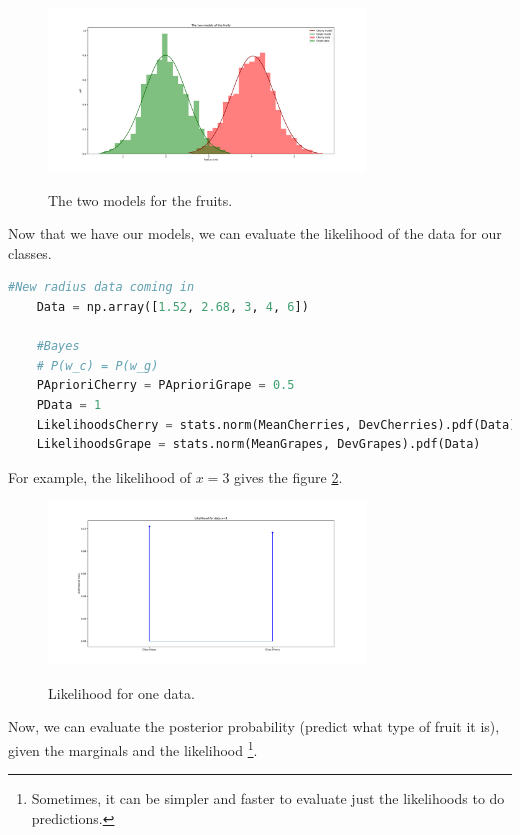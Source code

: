 \documentclass[runningheads,a4paper]{llncs}
\begin{document}
	\begin{figure}
	\centering
	\includegraphics[width=0.75\textwidth]{Figures/distrib}
	\\ \parbox{0.75\textwidth}{\caption[Distribution]{The two models for the fruits.}\label{fig:distrib}} 
	\end{figure}
	
	Now that we have our models, we can evaluate the likelihood of the data for our classes. 
	\begin{lstlisting}[language=python]
	#New radius data coming in
	Data = np.array([1.52, 2.68, 3, 4, 6])
	
	#Bayes
	# P(w_c) = P(w_g)
	PAprioriCherry = PAprioriGrape = 0.5
	PData = 1
	LikelihoodsCherry = stats.norm(MeanCherries, DevCherries).pdf(Data)
	LikelihoodsGrape = stats.norm(MeanGrapes, DevGrapes).pdf(Data)
	\end{lstlisting}
	
	For example, the likelihood of $x = 3$ gives the figure \ref{fig:likelihood}.
	
	\begin{figure}
		\centering
		\includegraphics[width=0.75\textwidth]{Figures/likelihood}
		\\ \parbox{0.75\textwidth}{\caption[Likelihood]{Likelihood for one data.}\label{fig:likelihood}} 
	\end{figure}
	
	Now, we can evaluate the posterior probability (predict what type of fruit it is), given the marginals and the likelihood \footnote{Sometimes, it can be simpler and faster to evaluate just the likelihoods to do predictions.}.
	
\end{document}
